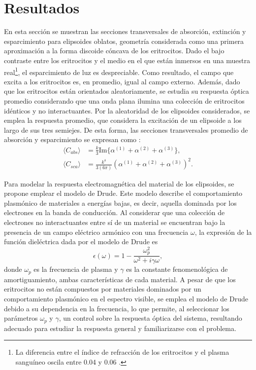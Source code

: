 	\hypertarget{resultados}{\section{Resultados}}
En esta sección se muestran las secciones transversales de absorción, extinción y esparcimiento para elipsoides oblatos, geometría considerada como una primera aproximación a la forma discoide cóncava de los eritrocitos. Dado el bajo contraste entre los eritrocitos y el medio en el que están inmersos en una muestra real\footnote{La diferencia entre el índice de refracción de los eritrocitos y el plasma sanguíneo oscila entre 0.04 y 0.06 \cite{Blood}.}, el esparcimiento de luz es despreciable. Como resultado, el campo que excita a los eritrocitos es, en promedio, igual al campo externo. Además, dado que los eritrocitos están orientados aleatoriamente, se estudia su respuesta óptica promedio considerando que una onda plana ilumina una colección de eritrocitos idénticos y no interactuantes. Por la aleatoridad de los elipsoides considerados, se emplea la respuesta promedio, que considera la excitación de un elipsoide a los largo de sus tres semiejes. De esta forma, las secciones transversales promedio de absorción y esparcimiento se expresan como \cite{Bohren}:
\begin{align*}
	\langle C_{abs}\rangle &= \frac{k}{3} \text{Im}\{\alpha^{(1)}+\alpha^{(2)}+\alpha^{(3)}\},\\
	\langle C_{sca}\rangle &= \frac{k^4}{3(6\pi)} \left(\alpha^{(1)}+\alpha^{(2)}+\alpha^{(3)}\right)^2.
\end{align*}

Para modelar la respuesta electromagnética del material de los elipsoides, se propone emplear el modelo de Drude. Este modelo describe el comportamiento plasmónico de materiales a energías bajas, es decir, aquella dominada por los electrones en la banda de conducción. Al considerar que una colección de electrones no interactuantes entre sí de un material se encuentran bajo la presencia de un campo eléctrico armónico con una frecuencia $\omega$, la expresión de la función dieléctrica dada por el modelo de Drude es \cite{Plasmonics}
\begin{equation} \epsilon(\omega) = 1 - \frac{\omega_p^2}{\omega^2 + i\gamma\omega}, 
\label{Drude}
\end{equation}
donde $\omega_p$ es la frecuencia de plasma y $\gamma$ es la constante fenomenológica de amortiguamiento, ambas características de cada material. A pesar de  que los eritrocitos no están compuestos por materiales dominados por un comportamiento plasmónico en el espectro visible, se emplea el modelo de Drude debido a su dependencia en la frecuencia, lo que permite, al seleccionar los parámetros $\omega_p$ y $\gamma$, un control sobre la respuesta óptica del sistema, resultando adecuado para estudiar la respuesta general y familiarizarse con el problema.\\

